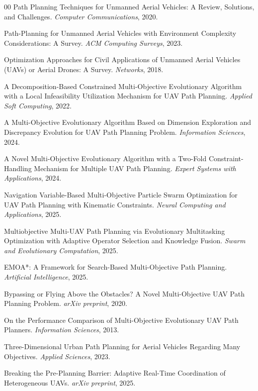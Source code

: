 \documentclass[a4paper,fleqn]{cas-dc}
\begin{document}
\begin{thebibliography}{00}
Path Planning Techniques for Unmanned Aerial Vehicles: A Review, Solutions, and Challenges.
\textit{Computer Communications}, 2020.

Path-Planning for Unmanned Aerial Vehicles with Environment Complexity Considerations: A Survey.
\textit{ACM Computing Surveys}, 2023.

Optimization Approaches for Civil Applications of Unmanned Aerial Vehicles (UAVs) or Aerial Drones: A Survey.
\textit{Networks}, 2018.

A Decomposition-Based Constrained Multi-Objective Evolutionary Algorithm with a Local Infeasibility Utilization Mechanism for UAV Path Planning.
\textit{Applied Soft Computing}, 2022.

A Multi-Objective Evolutionary Algorithm Based on Dimension Exploration and Discrepancy Evolution for UAV Path Planning Problem.
\textit{Information Sciences}, 2024.

A Novel Multi-Objective Evolutionary Algorithm with a Two-Fold Constraint-Handling Mechanism for Multiple UAV Path Planning.
\textit{Expert Systems with Applications}, 2024.

Navigation Variable-Based Multi-Objective Particle Swarm Optimization for UAV Path Planning with Kinematic Constraints.
\textit{Neural Computing and Applications}, 2025.

Multiobjective Multi-UAV Path Planning via Evolutionary Multitasking Optimization with Adaptive Operator Selection and Knowledge Fusion.
\textit{Swarm and Evolutionary Computation}, 2025.

EMOA*: A Framework for Search-Based Multi-Objective Path Planning.
\textit{Artificial Intelligence}, 2025.

Bypassing or Flying Above the Obstacles? A Novel Multi-Objective UAV Path Planning Problem.
\textit{arXiv preprint}, 2020.

On the Performance Comparison of Multi-Objective Evolutionary UAV Path Planners.
\textit{Information Sciences}, 2013.

Three-Dimensional Urban Path Planning for Aerial Vehicles Regarding Many Objectives.
\textit{Applied Sciences}, 2023.

Breaking the Pre-Planning Barrier: Adaptive Real-Time Coordination of Heterogeneous UAVs.
\textit{arXiv preprint}, 2025.


\end{thebibliography}
\end{document}
